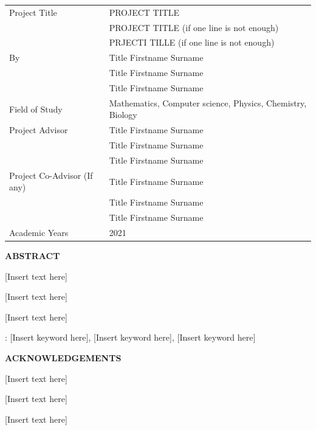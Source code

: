 \documentclass[12pt,a4paper,oneside]{book}
\theoremstyle{plain}
\numberwithin{equation}{chapter} \DeclareMathOperator{\Var}{Var}
\begin{document}
\newpage
{}
\begin{table}[h]
	\begin{tabular}{ll}
		Project Title								   & PROJECT TITLE  \\
										 					&PROJECT TITLE (if one line is not enough) \\
										 					& PRJECTI TILLE (if one line is not enough) \\
		By							   					  & Title Firstname Surname \\
															& Title Firstname Surname \\
															& Title Firstname Surname \\
		Field of Study			  					 & Mathematics, Computer science, Physics, Chemistry,
Biology
\\
		Project Advisor								& Title Firstname Surname \\
															& Title Firstname Surname \\
															& Title Firstname Surname \\
		Project Co-Advisor (If any)			  & Title Firstname Surname \\
															& Title Firstname Surname \\
															& Title Firstname Surname \\
		Academic Years							  & 2021 \\
	\end{tabular}
\end{table}
\begin{center}
  \large{\textbf{ABSTRACT}}\\
\end{center}

[Insert text here]

[Insert text here]

[Insert text here]

 : [Insert keyword here], [Insert keyword here], [Insert keyword here]

\newpage
\begin{center}
	\large{\textbf{ACKNOWLEDGEMENTS}} \\
\end{center}

[Insert text here]

[Insert text here]

[Insert text here]\\\\
\end{document}
